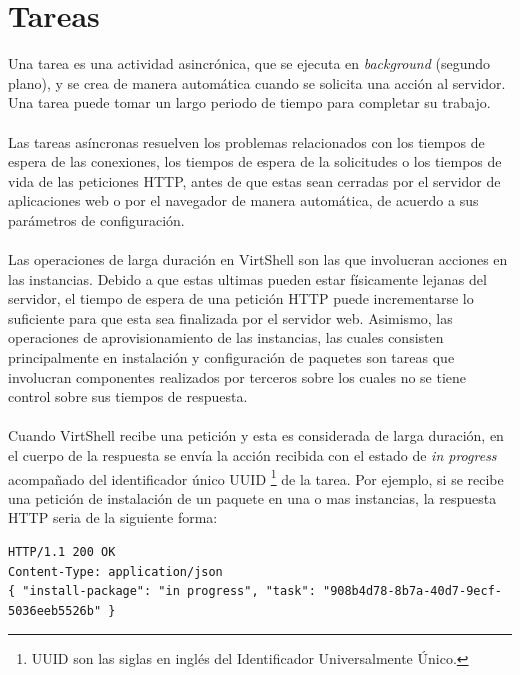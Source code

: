 \section{Tareas}
Una tarea es una actividad asincrónica, que se ejecuta en \emph{background} (segundo plano), y se crea de manera automática cuando se solicita una acción al servidor. Una tarea puede tomar un largo periodo de tiempo para completar su trabajo.\\
\\
Las tareas asíncronas resuelven los problemas relacionados con los tiempos de espera de las conexiones, los tiempos de espera de la solicitudes o los tiempos de vida de las peticiones HTTP,  antes de que estas sean cerradas por el servidor de aplicaciones web o por el navegador de manera automática, de acuerdo a sus parámetros de configuración.\\
\\
Las operaciones de larga duración en VirtShell son las que involucran acciones en las instancias. Debido a que estas ultimas pueden estar físicamente lejanas del servidor, el tiempo de espera de una petición HTTP puede incrementarse lo suficiente para que esta sea finalizada por el servidor web. Asimismo, las operaciones de aprovisionamiento de las instancias, las cuales consisten principalmente en instalación y configuración de paquetes son tareas que involucran componentes realizados por terceros sobre los cuales no se tiene control sobre sus tiempos de respuesta.\\
\\
Cuando VirtShell recibe una petición y esta es considerada de larga duración, en el cuerpo de la respuesta se envía la acción recibida con el estado de \emph{in progress} acompañado del identificador único UUID \footnote{UUID son las siglas en inglés del Identificador Universalmente Único.} de la tarea. Por ejemplo, si se recibe una petición de instalación de un paquete en una o mas instancias, la respuesta HTTP seria de la siguiente forma:

\vspace{5mm}

\begin{lstlisting}[style=json, caption=Ejemplo de respuesta HTTP referenciando a una tarea]
HTTP/1.1 200 OK
Content-Type: application/json
{ "install-package": "in progress", "task": "908b4d78-8b7a-40d7-9ecf-5036eeb5526b" }
\end{lstlisting}

\vspace{5mm}

